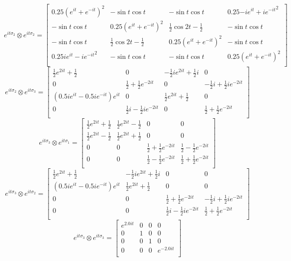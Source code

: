 \documentclass{article}
\begin{document}
\[ e^{it\sigma_2} \otimes e^{it\sigma_2} = \left[
    \begin{array}{cccc}
    0.25(e^{it} + e^{-it})^2 & -\sin{t}\cos{t} & -\sin{t}\cos{t} & 0.25{-ie^{it} + ie^{-it}}^2 \\
    -\sin{t}\cos{t} & 0.25(e^{it} + e^{-it})^2 & \frac{1}{2}\cos{2t} - \frac{1}{2} & -\sin{t}\cos{t} \\
    -\sin{t}\cos{t} & \frac{1}{2}\cos{2t} - \frac{1}{2} & 0.25(e^{it} + e^{-it})^2 & -\sin{t}\cos{t} \\
    0.25{ie^{it} - ie^{-it}}^2 & -\sin{t}\cos{t} & -\sin{t}\cos{t} & 0.25(e^{it} + e^{-it})^2 \\
    \end{array}
    \right]  \]
\[ e^{it\sigma_2} \otimes e^{it\sigma_3} =  \left[
    \begin{array}{cccc}
    \frac{1}{2}e^{2it} + \frac{1}{2} & 0 & -\frac{1}{2}ie^{2it} + \frac{1}{2}i & 0 \\
    0 & \frac{1}{2} + \frac{1}{2}e^{-2it} & 0 & -\frac{1}{2}i + \frac{1}{2}ie^{-2it} \\
    ({0.5ie^{it} - 0.5ie^{-it}})e^{it} & 0 & \frac{1}{2}e^{2it} + \frac{1}{2} & 0 \\
    0 & \frac{1}{2}i - \frac{1}{2}ie^{-2it} & 0 & \frac{1}{2} + \frac{1}{2}e^{-2it} \\
    \end{array}
    \right]  \]
\[ e^{it\sigma_3} \otimes e^{it\sigma_1} =   \left[
    \begin{array}{cccc}
    \frac{1}{2}e^{2it} + \frac{1}{2} & \frac{1}{2}e^{2it} - \frac{1}{2} & 0 & 0 \\
    \frac{1}{2}e^{2it} - \frac{1}{2} & \frac{1}{2}e^{2it} + \frac{1}{2} & 0 & 0 \\
    0 & 0 & \frac{1}{2} + \frac{1}{2}e^{-2it} & \frac{1}{2} - \frac{1}{2}e^{-2it} \\
    0 & 0 & \frac{1}{2} - \frac{1}{2}e^{-2it} & \frac{1}{2} + \frac{1}{2}e^{-2it} \\
    \end{array}
    \right]  \]
\[ e^{it\sigma_3} \otimes e^{it\sigma_2} =  \left[
    \begin{array}{cccc}
    \frac{1}{2}e^{2it} + \frac{1}{2} & -\frac{1}{2}ie^{2it} + \frac{1}{2}i & 0 & 0 \\
    ({0.5ie^{it} - 0.5ie^{-it}})e^{it} & \frac{1}{2}e^{2it} + \frac{1}{2} & 0 & 0 \\
    0 & 0 & \frac{1}{2} + \frac{1}{2}e^{-2it} & -\frac{1}{2}i + \frac{1}{2}ie^{-2it} \\
    0 & 0 & \frac{1}{2}i - \frac{1}{2}ie^{-2it} & \frac{1}{2} + \frac{1}{2}e^{-2it} \\
    \end{array}
    \right]   \]
\[ e^{it\sigma_3} \otimes e^{it\sigma_3} =  \left[
    \begin{array}{cccc}
    e^{2.0it} & 0 & 0 & 0 \\
    0 & 1 & 0 & 0 \\
    0 & 0 & 1 & 0 \\
    0 & 0 & 0 & e^{-2.0it} \\
    \end{array}
    \right] \]
\end{document}
